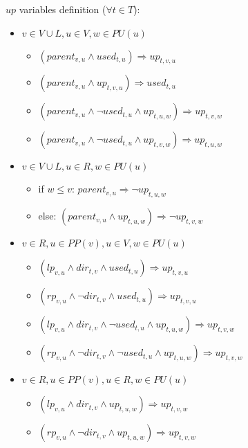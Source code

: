 \documentclass[runningheads, envcountsame, a4paper]{llncs}
\begin{document}
$up$ variables definition ($\forall t \in T$):
\begin{itemize}
\item $v \in V \cup L, u \in V, w \in PU(u)$
    \begin{itemize}
    \item $(parent_{v,u} \wedge used_{t,u}) \Rightarrow up_{t,v,u}$
    \item $(parent_{v,u} \wedge up_{t,v,u}) \Rightarrow used_{t,u}$
    \item $(parent_{v,u} \wedge \neg used_{t,u} \wedge up_{t,u,w}) \Rightarrow up_{t,v,w}$
    \item $(parent_{v,u} \wedge \neg used_{t,u} \wedge up_{t,v,w}) \Rightarrow up_{t,u,w}$
    \end{itemize}
\item $v \in V \cup L, u \in R, w \in PU(u)$
    \begin{itemize}
    \item if $w \leq v$: $parent_{v,u} \Rightarrow \neg up_{t,u,w}$
    \item else: $(parent_{v,u} \wedge up_{t,u,w}) \Rightarrow \neg up_{t,v,w}$
    \end{itemize}                                                                         
\item $v \in R, u \in PP(v), u \in V, w \in PU(u)$
    \begin{itemize}
    \item $(lp_{v,u} \wedge dir_{t,v} \wedge used_{t,u}) \Rightarrow up_{t,v,u}$
    \item $(rp_{v,u} \wedge \neg dir_{t,v} \wedge used_{t,u}) \Rightarrow up_{t,v,u}$

    \item $(lp_{v,u} \wedge dir_{t,v} \wedge \neg used_{t,u} \wedge up_{t,u,w}) \Rightarrow up_{t,v,w}$
    \item $(rp_{v,u} \wedge \neg dir_{t,v} \wedge \neg used_{t,u} \wedge up_{t,u,w}) \Rightarrow up_{t,v,w}$
    \end{itemize}
\item $v \in R, u \in PP(v), u \in R, w \in PU(u)$
    \begin{itemize}
    \item $(lp_{v,u} \wedge dir_{t,v} \wedge up_{t,u,w}) \Rightarrow up_{t,v,w}$
    \item $(rp_{v,u} \wedge \neg dir_{t,v} \wedge up_{t,u,w}) \Rightarrow up_{t,v,w}$
    \end{itemize}
\end{itemize}
\end{document}
